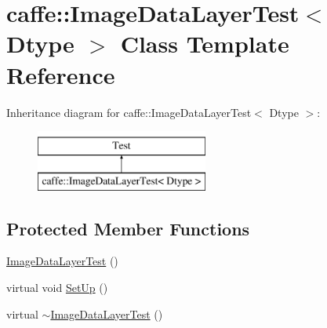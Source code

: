 \hypertarget{classcaffe_1_1_image_data_layer_test}{\section{caffe\+:\+:Image\+Data\+Layer\+Test$<$ Dtype $>$ Class Template Reference}
\label{classcaffe_1_1_image_data_layer_test}
}
Inheritance diagram for caffe\+:\+:Image\+Data\+Layer\+Test$<$ Dtype $>$\+:\begin{figure}[H]
\begin{center}
\leavevmode
\includegraphics[height=2.000000cm]{classcaffe_1_1_image_data_layer_test}
\end{center}
\end{figure}
\subsection*{Protected Member Functions}
\begin{DoxyCompactItemize}
\item 
\hyperlink{classcaffe_1_1_image_data_layer_test_af1d71a610e1c3b64fb83c8104e7b3251}{Image\+Data\+Layer\+Test} ()
\item 
virtual void \hyperlink{classcaffe_1_1_image_data_layer_test_a912500336c22c500a0f3da9e5d63b50c}{Set\+Up} ()
\item 
virtual \hyperlink{classcaffe_1_1_image_data_layer_test_a0e84bd1ec1abea04a22efde477f32739}{$\sim$\+Image\+Data\+Layer\+Test} ()
\end{DoxyCompactItemize}
